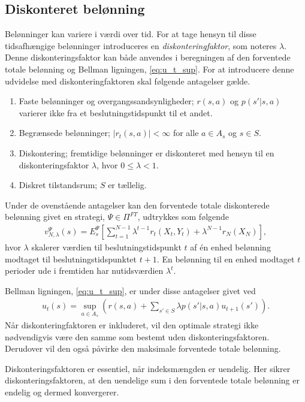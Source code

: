 \subsection{Diskonteret belønning}
Belønninger kan variere i værdi over tid. For at tage hensyn til disse tidsafhængige belønninger introduceres en \textit{diskonteringfaktor}, som noteres $\lambda$. Denne diskonteringsfaktor kan både anvendes i beregningen af den forventede totale belønning og Bellman ligningen, \eqref{eq:u_t_sup}. For at introducere denne udvidelse med diskonteringfaktoren skal følgende antagelser gælde.

\begin{enumerate}
    \item Faste belønninger og overgangssandsynligheder; $r(s,a)$ og $p(s'|s,a)$ varierer ikke fra et beslutningstidspunkt til et andet.
    \item Begrænsede belønninger; $|r_t(s,a)| < \infty$ for alle $a\in A_s$ og $s\in S$.
    \item Diskontering; fremtidige belønninger er diskonteret med hensyn til en diskonteringsfaktor $\lambda$, hvor $0 \leq \lambda < 1$.
    \item Diskret tilstandsrum; $S$ er tællelig.
\end{enumerate}

Under de ovenstående antagelser kan den forventede totale diskonterede belønning givet en strategi, $\Psi\in \Pi^{FT}$, udtrykkes som følgende 
\begin{align*}
    v_{N,\lambda}^\Psi(s)=E_s^\Psi\left[\sum_{t=1}^{N-1}\lambda^{t-1}r_t(X_t, Y_t)+\lambda^{N-1}r_N(X_N)\right],
\end{align*}
hvor $\lambda$ skalerer værdien til beslutningstidspunkt $t$ af én enhed belønning modtaget til beslutningstidspunktet $t+1$. 
En belønning til en enhed modtaget $t$ perioder ude i fremtiden har nutidsværdien $\lambda^t$.

Bellman ligningen, \eqref{eq:u_t_sup}, er under disse antagelser givet ved
\begin{align*}
    u_t(s) = \sup_{a \in A_s} \left( r(s,a) + \sum_{s'\in S} \lambda p\left(s'|s,a\right)u_{t+1}(s')\right).
\end{align*}
Når diskonteringfaktoren er inkluderet, vil den optimale strategi ikke nødvendigvis være den samme som bestemt uden diskonteringsfaktoren. Derudover vil den også påvirke den maksimale forventede totale belønning. 

Diskonteringsfaktoren er essentiel, når indeksmængden er uendelig. Her sikrer diskonteringsfaktoren, at den uendelige sum i den forventede totale belønning er endelig og dermed konvergerer. 


